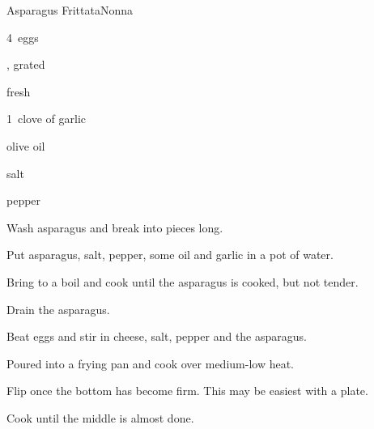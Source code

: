 \begin{recipe}{Asparagus Frittata}{Nonna}{}

\begin{ingredients}
\item 4~eggs
\item {}, grated
\item \C{1\half} fresh 
\item 1~clove of garlic
\item olive oil
\item salt
\item pepper
\end{ingredients}

\begin{directions}
\item Wash asparagus and break into pieces  long.
\item Put asparagus, salt, pepper, some oil and garlic in a pot of water.
\item Bring to a boil and cook until the asparagus is cooked, but not tender.
\item Drain the asparagus.
\item Beat eggs and stir in cheese, salt, pepper and the asparagus.
\item Poured into a frying pan and cook over medium-low heat.
\item Flip once the bottom has become firm. This may be easiest with a plate.
\item Cook until the middle is almost done.
\end{directions}

\end{recipe}
